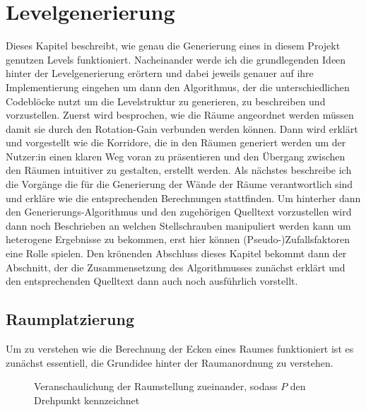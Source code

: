 \chapter{Levelgenerierung}
\label{section:generate}
Dieses Kapitel beschreibt, wie genau die Generierung eines in diesem Projekt genutzen Levels funktioniert. Nacheinander werde ich die grundlegenden Ideen hinter der Levelgenerierung erörtern und dabei jeweils genauer auf ihre Implementierung eingehen um dann den Algorithmus, der die unterschiedlichen Codeblöcke nutzt um die Levelstruktur zu generieren, zu beschreiben und vorzustellen.
Zuerst wird besprochen, wie die Räume angeordnet werden müssen damit sie durch den Rotation-Gain verbunden werden können. Dann wird erklärt und vorgestellt wie die Korridore, die in den Räumen generiert werden um der Nutzer:in einen klaren Weg voran zu präsentieren und den Übergang zwischen den Räumen intuitiver zu gestalten, erstellt werden. Als nächstes beschreibe ich die Vorgänge die für die Generierung der Wände der Räume verantwortlich sind und erkläre wie die entsprechenden Berechnungen stattfinden.
Um hinterher dann den Generierungs-Algorithmus und den zugehörigen Quelltext vorzustellen wird dann noch Beschrieben an welchen Stellschrauben manipuliert werden kann um heterogene Ergebnisse zu bekommen, erst hier können (Pseudo-)Zufallsfaktoren eine Rolle spielen.
Den krönenden Abschluss dieses Kapitel bekommt dann der Abschnitt,
der die Zusammensetzung des Algorithmusses zunächst erklärt und den entsprechenden Quelltext dann auch noch ausführlich vorstellt.

\section{Raumplatzierung}

Um zu verstehen wie die Berechnung der Ecken eines Raumes funktioniert ist es zunächst essentiell, die Grundidee hinter der Raumanordnung zu verstehen.

\begin{figure}[H]
    \caption{Veranschaulichung der Raumstellung zueinander, sodass $P$ den Drehpunkt kennzeichnet }\label{figure:two_rooms} %
\end{figure}

